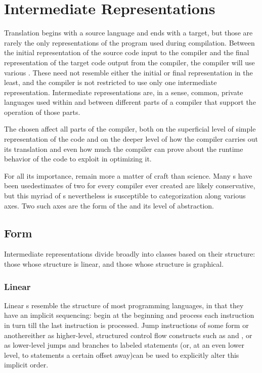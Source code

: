 \section{Intermediate Representations}
Translation begins with a source language and ends with a target, but those are rarely the only representations of the program used during compilation. Between the initial representation of the source code input to the compiler and the final representation of the target code output from the compiler, the compiler will use various . These need not resemble either the initial or final representation in the least, and the compiler is not restricted to use only one intermediate representation. Intermediate representations are, in a sense, common, private languages used within and between different parts of a compiler that support the operation of those parts.

The \IRs chosen affect all parts of the compiler, both on the superficial level of simple representation of the code and on the deeper level of how the compiler carries out its translation and even how much the compiler can prove about the runtime behavior of the code to exploit in optimizing it.

For all its importance, \IRs remain more a matter of craft than science. Many s have been used\empause estimates of two for every compiler ever created are likely conservative\empause , but this myriad of s nevertheless is susceptible to categorization along various axes. Two such axes are the form of the \IR and its level of abstraction.

\subsection{Form}
Intermediate representations divide broadly into classes based on their structure: those whose structure is linear, and those whose structure is graphical.

\subsubsection{Linear}
Linear s resemble the structure of most programming languages, in that they have an implicit sequencing: begin at the beginning and process each instruction in turn till the last instruction is processed. Jump instructions of some form or another\empause either as higher-level, structured control flow constructs such as  and , or as lower-level jumps and branches to labeled statements (or, at an even lower level, to statements a certain offset away)\empause can be used to explicitly alter this implicit order.

